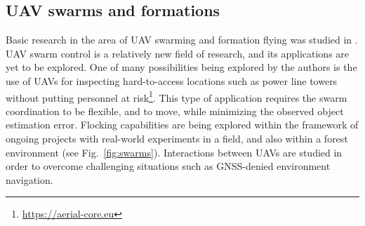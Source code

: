 \documentclass[a4paper,11pt,titlepage,twoside]{book}
\newcommand{\reffig}[1]{Fig.~\ref{#1}}
\begin{document}

\subsection{UAV swarms and formations}
\label{sec:uav_swarms_and_formations}

Basic research in the area of \ac{UAV} swarming and formation flying was studied in \cite{saska2020formation, saska2016formations, saska2019large}.
\ac{UAV} swarm control is a relatively new field of research, and its applications are yet to be explored.
One of many possibilities being explored by the authors is the use of \acp{UAV} for inspecting hard-to-access locations such as power line towers without putting personnel at risk\footnote{\url{https://aerial-core.eu}}.
This type of application requires the swarm coordination to be flexible, and to move, while minimizing the observed object estimation error.
Flocking capabilities are being explored within the framework of ongoing projects with real-world experiments in a field, and also within a forest environment (see \reffig{fig:swarms}).
Interactions between \acp{UAV} are studied in order to overcome challenging situations such as GNSS-denied environment navigation.

\end{document}
